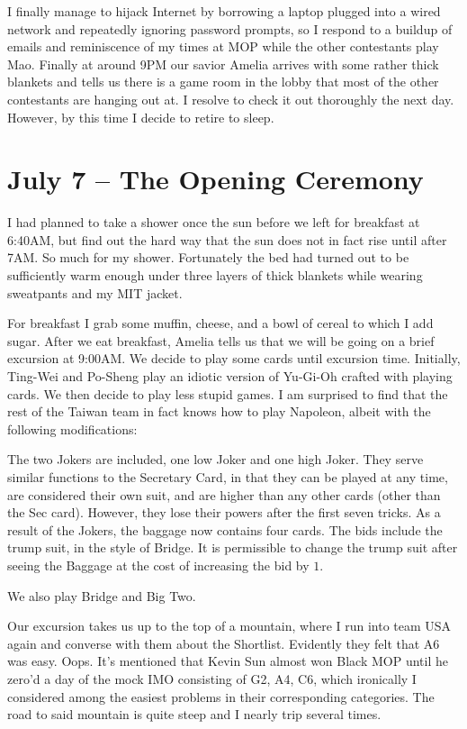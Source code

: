 \documentclass[11pt]{scrreprt}
\numberwithin{figure}{chapter}
\begin{document}
I finally manage to hijack Internet by borrowing a laptop plugged into a wired
network and repeatedly ignoring password
prompts, so I respond to a buildup of emails and reminiscence of my times at MOP
while the other contestants play Mao.
Finally at around 9PM our savior Amelia arrives with some rather thick blankets
and tells us there is a game room in
the lobby that most of the other contestants are hanging out at.
I resolve to check it out thoroughly the next day.
However, by this time I decide to retire to sleep.

\section{July 7 -- The Opening Ceremony}
I had planned to take a shower once the sun before we left for breakfast at 6:40AM, but find out the hard way
that the sun does not in fact rise until after 7AM.
So much for my shower.
Fortunately the bed had turned out to be sufficiently warm enough under three layers of thick blankets
while wearing sweatpants and my MIT jacket.

For breakfast I grab some muffin, cheese, and a bowl of cereal to which I add sugar.
After we eat breakfast, Amelia tells us that we will be going on a brief excursion at 9:00AM.
We decide to play some cards until excursion time.
Initially, Ting-Wei and Po-Sheng play an idiotic version of Yu-Gi-Oh crafted with playing cards.
We then decide to play less stupid games.
I am surprised to find that the rest of the Taiwan team in fact knows how to play Napoleon, albeit
with the following modifications:
\begin{itemize}
  \ii The two Jokers are included, one low Joker and one high Joker.
  They serve similar functions to the Secretary Card, in that they can be played at any time,
  are considered their own suit, and are higher than any other cards (other than the Sec card).
  However, they lose their powers after the first seven tricks.
  \ii As a result of the Jokers, the baggage now contains four cards.
  \ii The bids include the trump suit, in the style of Bridge.
  It is permissible to change the trump suit after seeing the Baggage at the cost
  of increasing the bid by $1$.
\end{itemize}
We also play Bridge and Big Two.

Our excursion takes us up to the top of a mountain, where I run into team USA again and converse
with them about the Shortlist. Evidently they felt that A6 was easy. Oops.
It's mentioned that Kevin Sun almost won Black MOP until he zero'd a day of the mock IMO consisting
of G2, A4, C6, which ironically I considered among the easiest problems in their corresponding categories.
The road to said mountain is quite steep and I nearly trip several times.
\end{document}
